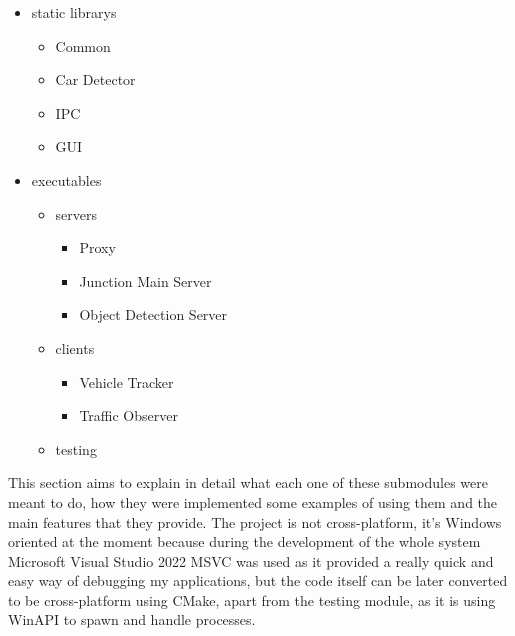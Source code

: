 \documentclass[17pt]{report}
\begin{document}
\begin{itemize}
    \item static librarys
    \begin{itemize}
        \item Common
        \item Car Detector
        \item IPC
        \item GUI
    \end{itemize}
    
    \item executables
    \begin{itemize}
        \item servers
        \begin{itemize}
            \item Proxy
            \item Junction Main Server
            \item Object Detection Server
        \end{itemize}
        \item  clients
        \begin{itemize}
            \item Vehicle Tracker
            \item Traffic Observer
        \end{itemize}
        \item testing
    \end{itemize}
\end{itemize}

This section aims to explain in detail what each one of these submodules were meant to do,
how they were implemented some examples of using them and the main features that they
provide. The project is not cross-platform, it's Windows oriented at the moment because
during the development of the whole system Microsoft Visual Studio 2022 MSVC was used
as it provided a really quick and easy way of debugging my applications, but 
the code itself can be later converted to be cross-platform using CMake, apart from
the testing module, as it is using WinAPI to spawn and handle processes. 


\pagebreak
\end{document}
